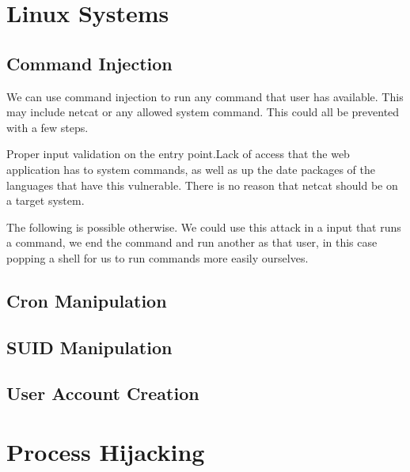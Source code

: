 \section{Linux Systems}
\subsection{Command Injection}
We can use command injection to run any command that user has available. This may include netcat or any allowed system command. This could all be prevented with a few steps. 

Proper input validation on the entry point.Lack of access that the web application has to system commands, as well as up the date packages of the languages that have this vulnerable. There is no reason that netcat should be on a target system. 

The following is possible otherwise. We could use this attack in a input that runs a command, we end the command and run another as that user, in this case popping a shell for us to run commands more easily ourselves.

\subsection{Cron Manipulation}

\subsection{SUID Manipulation}

\subsection{User Account Creation}
\section{Process Hijacking}







